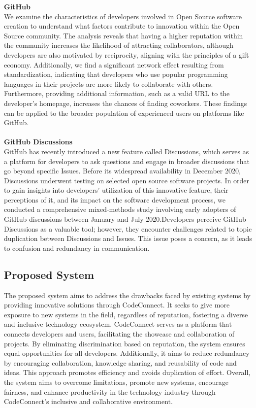 \textbf{GitHub}\\
We examine the characteristics of developers involved in Open Source software creation to understand what factors contribute to innovation within the Open Source community. The analysis reveals that having a higher reputation within the community increases the likelihood of attracting collaborators, although developers are also motivated by reciprocity, aligning with the principles of a gift economy. Additionally, we find a significant network effect resulting from standardization, indicating that developers who use popular programming languages in their projects are more likely to collaborate with others. Furthermore, providing additional information, such as a valid URL to the developer's homepage, increases the chances of finding coworkers. These findings can be applied to the broader population of experienced users on platforms like GitHub.\cite{celinska2018coding}\\\\
\textbf{GitHub Discussions}\\
GitHub has recently introduced a new feature called Discussions, which serves as a platform for developers to ask questions and engage in broader discussions that go beyond specific Issues. Before its widespread availability in December 2020, Discussions underwent testing on selected open source software projects. In order to gain insights into developers' utilization of this innovative feature, their perceptions of it, and its impact on the software development process, we conducted a comprehensive mixed-methods study involving early adopters of GitHub discussions between January and July 2020.Developers perceive GitHub Discussions as a valuable tool; however, they encounter challenges related to topic duplication between Discussions and Issues. This issue poses a concern, as it leads to confusion and redundancy in communication.\cite{hata2022github}
\subsection{Proposed System}
The proposed system aims to address the drawbacks faced by existing systems by providing innovative solutions through CodeConnect. It seeks to give more exposure to new systems in the field, regardless of reputation, fostering a diverse and inclusive technology ecosystem. CodeConnect serves as a platform that connects developers and users, facilitating the showcase and collaboration of projects. By eliminating discrimination based on reputation, the system ensures equal opportunities for all developers. Additionally, it aims to reduce redundancy by encouraging collaboration, knowledge sharing, and reusability of code and ideas. This approach promotes efficiency and avoids duplication of effort. Overall, the system aims to overcome limitations, promote new systems, encourage fairness, and enhance productivity in the technology industry through CodeConnect's inclusive and collaborative environment.
